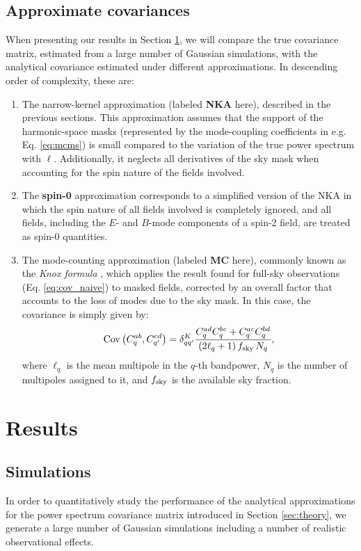 \documentclass[a4paper,11pt]{article}
\begin{document}
    \subsection{Approximate covariances}\label{ssec:theory.approx}
      When presenting our results in Section \ref{sec:results}, we will compare the true covariance matrix, estimated from a large number of Gaussian simulations, with the analytical covariance estimated under different approximations. In descending order of complexity, these are:
      \begin{enumerate}
        \item The narrow-kernel approximation (labeled {\bf NKA} here), described in the previous sections. This approximation assumes that the support of the harmonic-space masks (represented by the mode-coupling coefficients in e.g. Eq. \ref{eq:mcms}) is small compared to the variation of the true power spectrum with $\ell$. Additionally, it neglects all derivatives of the sky mask when accounting for the spin nature of the fields involved.
        \item The {\bf spin-0} approximation corresponds to a simplified version of the NKA in which the spin nature of all fields involved is completely ignored, and all fields, including the $E$- and $B$-mode components of a spin-2 field, are treated as spin-0 quantities.
        \item The mode-counting approximation (labeled {\bf MC} here),
          commonly known as the {\sl Knox formula} \cite{1995PhRvD..52.4307K},
          which applies the result found for full-sky observations (Eq.
          \ref{eq:cov_naive}) to masked fields, corrected by an overall factor that accounts to the loss of modes due to the sky mask. In this case, the covariance is simply given by:
        \begin{equation}\label{eq:cov_naive_bpw}
          {\rm Cov}\left(C^{ab}_q,C^{cd}_{q'}\right)=\delta^K_{qq'}\frac{C^{ad}_qC^{bc}_q+C^{ac}_qC^{bd}_q}{(2\ell_q+1)\,f_{\rm sky}\,N_q},
        \end{equation}
        where $\ell_q$ is the mean multipole in the $q$-th bandpower, $N_q$ is the number of multipoles assigned to it, and $f_{\rm sky}$ is the available sky fraction.
      \end{enumerate}

  \section{Results}\label{sec:results}
    \subsection{Simulations}\label{ssec:results.sims}
      In order to quantitatively study the performance of the analytical approximations for the power spectrum covariance matrix introduced in Section \ref{sec:theory}, we generate a large number of Gaussian simulations including a number of realistic observational effects.
      
\end{document}

